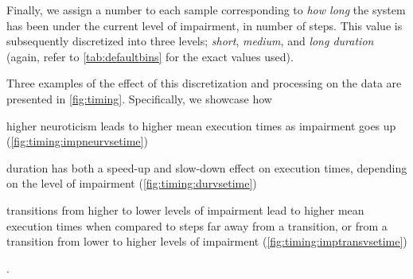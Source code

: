 Finally, we assign a number to each sample corresponding to \emph{how long} the system has been under the current level of impairment, in number of steps.
This value is subsequently discretized into three levels; \emph{short}, \emph{medium}, and \emph{long duration} (again, refer to \cref{tab:defaultbins} for the exact values used).

Three examples of the effect of this discretization and processing on the data are presented in \cref{fig:timing}.
Specifically, we showcase how
\begin{enumerate*}[itemjoin={{; }}, itemjoin*={{; and}}]
    \item higher neuroticism leads to higher mean execution times as impairment goes up (\cref{fig:timing:impneurvsetime})
    \item duration has both a speed-up and slow-down effect on execution times, depending on the level of impairment (\cref{fig:timing:durvsetime})
    \item transitions from higher to lower levels of impairment lead to higher mean execution times when compared to steps far away from a transition, or from a transition from lower to higher levels of impairment (\cref{fig:timing:imptransvsetime})
\end{enumerate*}.


